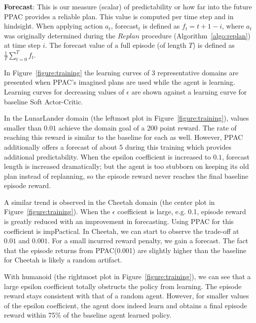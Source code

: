 \documentclass{article}
\begin{document}
            \textbf{Forecast}: This is our measure (scalar) of predictability or how far into the future PPAC provides a reliable plan. This value is computed per time step and in hindsight. When applying action $a_t$, forecast$_t$ is defined as $f_t=t+1-i$, where $a_t$ was originally determined during the $Replan$ procedure (Algorithm~\ref{algo:replan}) at time step $i$. The forecast value of a full episode (of length $T$) is defined as $\frac{1}{T}\sum_{t=0}^Tf_t$.

            In Figure~\ref{figure:training} the learning curves of 3 representative domains are presented when PPAC's imagined plans are used while the agent is learning. Learning curves for decreasing values of $\epsilon$ are shown against a learning curve for baseline Soft Actor-Critic.

            In the LunarLander domain (the leftmost plot in Figure~\ref{figure:training}), values smaller than $0.01$ achieve the domain goal of a 200 point reward. The rate of reaching this reward is similar to the baseline for each as well. However, PPAC additionally offers a forecast of about 5 during this training which provides additional predictability. When the epsilon coefficient is increased to $0.1$, forecast length is increased dramatically; but the agent is too stubborn on keeping its old plan instead of replanning, so the episode reward never reaches the final baseline episode reward.

            A similar trend is observed in the Cheetah domain (the center plot in Figure~\ref{figure:training}). When the $\epsilon$ coefficient is large, e.g. 0.1, episode reward is greatly reduced with an improvement in forecasting. Using PPAC for this coefficient is impPactical. In Cheetah, we can start to observe the trade-off at $0.01$ and $0.001$. For a small incurred reward penalty, we gain a forecast. The fact that the episode returns from PPAC(0.001) are slightly higher than the baseline for Cheetah is likely a random artifact.

            With humanoid (the rightmost plot in Figure~\ref{figure:training}), we can see that a large epsilon coefficient totally obstructs the policy from learning. The episode reward stays consistent with that of a random agent. However, for smaller values of the epsilon coefficient, the agent does indeed learn and obtains a final episode reward within 75\% of the baseline agent learned policy. 
\end{document}

